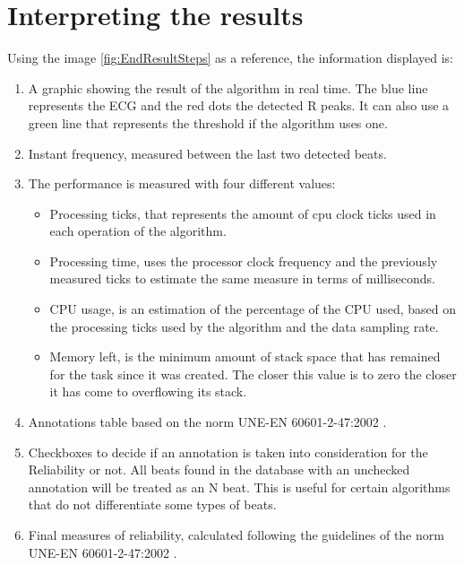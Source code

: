 \clearpage
\section{Interpreting the results}
Using the image \ref{fig:EndResultSteps} as a reference, the information displayed is:

\begin{enumerate}
    \item  A graphic showing the result of the algorithm in real time. The blue line represents the ECG and the red dots the detected R peaks. It can also use a green line that represents the threshold if the algorithm uses one.
    \item Instant frequency, measured between the last two detected beats.
    \item The performance is measured with four different values:
    \begin{itemize}
        \item Processing ticks, that represents the amount of cpu clock ticks used in each operation of the algorithm.
        \item Processing time, uses the processor clock frequency and the previously measured ticks to estimate the same measure in terms of milliseconds.
        \item CPU usage, is an estimation of the percentage of the CPU used, based on the processing ticks used by the algorithm and the data sampling rate.
        \item Memory left, is the minimum amount of stack space that has remained for the task since it was created.  The closer this value is to zero the closer it has come to overflowing its stack.
    \end{itemize}
    \item Annotations table based on the norm UNE-EN 60601-2-47:2002 \cite{Aenor2002}.
    \item Checkboxes to decide if an annotation is taken into consideration for the Reliability or not. All beats found in the database with an unchecked annotation will be treated as an N beat. This is useful for certain algorithms that do not differentiate some types of beats. 
    \item Final measures of reliability, calculated following the guidelines of the norm UNE-EN 60601-2-47:2002 \cite{Aenor2002}.

\end{enumerate}

